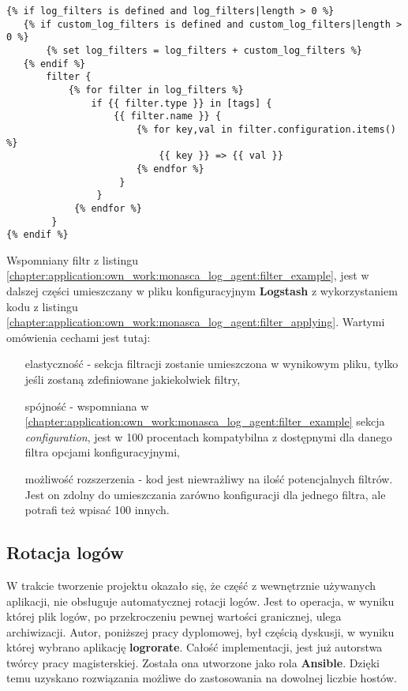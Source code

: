\begin{listing}[H]
    \begin{verbatim}
{% if log_filters is defined and log_filters|length > 0 %}
   {% if custom_log_filters is defined and custom_log_filters|length > 0 %}
       {% set log_filters = log_filters + custom_log_filters %}
   {% endif %}
       filter {
           {% for filter in log_filters %}
               if {{ filter.type }} in [tags] {
                   {{ filter.name }} {
                       {% for key,val in filter.configuration.items() %}
                           {{ key }} => {{ val }}
                       {% endfor %}
                    }
                }
            {% endfor %}
        }
{% endif %}
    \end{verbatim}
    \label{chapter:application:own_work:monasca_log_agent:filter_applying}
    \caption[Wpisanie filtrów do pliku konfiguracyjnego \textbf{Logstash}]{
        Wpisanie filtrów do pliku konfiguracyjnego \textbf{Logstash}, źródło: \url{https://github.com/FujitsuEnablingSoftwareTechnologyGmbH/ansible-monasca-log-agent/blob/master/templates/agent.conf.j2}}
\end{listing}

Wspomniany filtr z listingu \ref{chapter:application:own_work:monasca_log_agent:filter_example}, jest w dalszej części umieszczany
w pliku konfiguracyjnym \textbf{Logstash} z wykorzystaniem kodu z listingu \ref{chapter:application:own_work:monasca_log_agent:filter_applying}. 
Wartymi omówienia cechami jest tutaj:
\begin{itemize}
    \item[elastyczność] - sekcja filtracji zostanie umieszczona w wynikowym pliku, tylko jeśli zostaną zdefiniowane jakiekolwiek filtry,
    \item[spójność] - wspomniana w \ref{chapter:application:own_work:monasca_log_agent:filter_example} sekcja \textit{configuration}, jest
    w 100 procentach kompatybilna z dostępnymi dla danego filtra opcjami konfiguracyjnymi,
    \item[możliwość rozszerzenia] - kod jest niewrażliwy na ilość potencjalnych filtrów. Jest on zdolny do umieszczania zarówno konfiguracji dla jednego
    filtra, ale potrafi też wpisać 100 innych. 
\end{itemize}

\subsection{Rotacja logów}
W trakcie tworzenie projektu okazało się, że część z wewnętrznie używanych aplikacji, nie obsługuje automatycznej rotacji logów. Jest
to operacja, w wyniku której plik logów, po przekroczeniu pewnej wartości granicznej, ulega archiwizacji. Autor, poniższej pracy dyplomowej,
był częścią dyskusji, w wyniku której wybrano aplikację \textbf{logrorate}. Całość implementacji, jest już autorstwa twórcy pracy magisterskiej.
Została ona utworzone jako rola \textbf{Ansible}. Dzięki temu uzyskano rozwiązania możliwe do zastosowania na dowolnej liczbie hostów.

